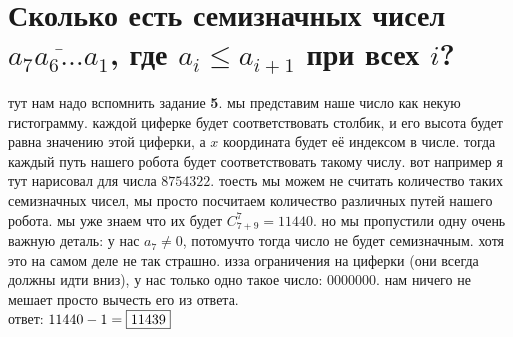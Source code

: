 \documentclass{article}
\newcommand{\Cnk}[2]{C_{#1}^{#2}}
\begin{document}
  \section{Сколько есть семизначных чисел $\overline{a_7a_6 \dots a_1}$, где $a_i \leq a_{i+1}$ при всех $i$?}
  \begin{figure}
    \vspace{-.5cm}
    \hfill
  \end{figure}
  тут нам надо вспомнить задание \textbf{5}. мы представим наше число как некую гистограмму.
  каждой циферке будет соответствовать столбик, и его высота будет равна значению этой циферки, а $x$ координата будет её индексом в числе.
  тогда каждый путь нашего робота будет соответствовать такому числу. вот например я тут нарисовал для числа $8754322$.
  тоесть мы можем не считать количество таких семизначных чисел, мы просто посчитаем количество различных путей нашего робота.
  мы уже знаем что их будет $\Cnk{7+9}{7} = 11440$.
  но мы пропустили одну очень важную деталь: у нас $a_7 \neq 0$, потомучто тогда число не будет семизначным.
  хотя это на самом деле не так страшно. изза ограничения на циферки (они всегда должны идти вниз), у нас только одно такое число: $0000000$.
  нам ничего не мешает просто вычесть его из ответа. \\
  ответ: $11440 - 1 = \fbox{11439}$
\end{document}
